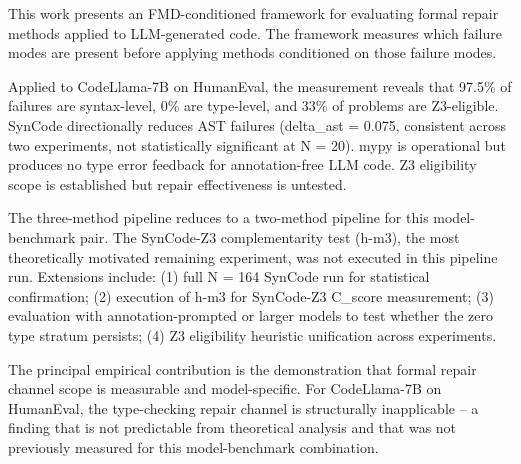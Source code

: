 
This work presents an FMD-conditioned framework for evaluating formal repair methods applied to LLM-generated code. The framework measures which failure modes are present before applying methods conditioned on those failure modes.

Applied to CodeLlama-7B on HumanEval, the measurement reveals that 97.5\% of failures are syntax-level, 0\% are type-level, and 33\% of problems are Z3-eligible. SynCode directionally reduces AST failures (delta_ast = 0.075, consistent across two experiments, not statistically significant at N = 20). mypy is operational but produces no type error feedback for annotation-free LLM code. Z3 eligibility scope is established but repair effectiveness is untested.

The three-method pipeline reduces to a two-method pipeline for this model-benchmark pair. The SynCode-Z3 complementarity test (h-m3), the most theoretically motivated remaining experiment, was not executed in this pipeline run. Extensions include: (1) full N = 164 SynCode run for statistical confirmation; (2) execution of h-m3 for SynCode-Z3 C_score measurement; (3) evaluation with annotation-prompted or larger models to test whether the zero type stratum persists; (4) Z3 eligibility heuristic unification across experiments.

The principal empirical contribution is the demonstration that formal repair channel scope is measurable and model-specific. For CodeLlama-7B on HumanEval, the type-checking repair channel is structurally inapplicable -- a finding that is not predictable from theoretical analysis and that was not previously measured for this model-benchmark combination.
